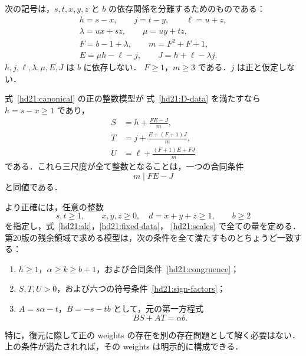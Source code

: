 次の記号は，$s,t,x,y,z$ と $b$ の依存関係を分離するためのものである：
\begin{equation}\label{hd21:fixed-data}
\begin{gathered}
 h=s-x,\qquad j=t-y,\qquad \ell=u+z,\\
 \lambda=ux+sz,\qquad \mu=uy+tz,\\
 F=b-1+\lambda,\qquad m=F^2+F+1,\\
 E=\mu h-\ell-j,\qquad J=h+\ell-\lambda j.
\end{gathered}
\end{equation}
$h,j,\ell,\lambda,\mu,E,J$ は $b$ に依存しない．
$F\ge1$，$m\ge3$ である．$j$ は正と仮定しない．

\begin{proposition}[単一合同条件を持つ復元表示]
\label{hd21:reconstruction}
式~\eqref{hd21:canonical} の正の整数模型が
式~\eqref{hd21:D-data} を満たすなら $h=s-x\ge1$ であり，
\begin{equation}\label{hd21:scales}
\begin{split}
 S&=h+\frac{FE-J}{m},\\
 T&=j+\frac{E+(F+1)J}{m},\\
 U&=\ell+\frac{(F+1)E+FJ}{m}
\end{split}
\end{equation}
である．これら三尺度が全て整数となることは，一つの合同条件
\begin{equation}\label{hd21:congruence}
 m\mid FE-J
\end{equation}
と同値である．

より正確には，任意の整数
\[
 s,t\ge1,\qquad x,y,z\ge0,\quad d=x+y+z\ge1,
 \qquad b\ge2
\]
を指定し，式~\eqref{hd21:ak}，\eqref{hd21:fixed-data}，
\eqref{hd21:scales} で全ての量を定める．
第20版の残余領域で求める模型は，次の条件を全て満たすものとちょうど一致する：
\begin{enumerate}
 \item $h\ge1$，$\alpha\ge k\ge b+1$，および合同条件~\eqref{hd21:congruence}；
 \item $S,T,U>0$，および六つの符号条件~\eqref{hd21:sign-factors}；
 \item $A=s\alpha-t$，$B=-s-tb$ として，元の第一方程式
 \begin{equation}\label{hd21:one-residue}
 BS+AT=\alpha b.
 \end{equation}
\end{enumerate}
特に，復元に際して正の weights の存在を別の存在問題として解く必要はない．
上の条件が満たされれば，その weights は明示的に構成できる．
\end{proposition}

